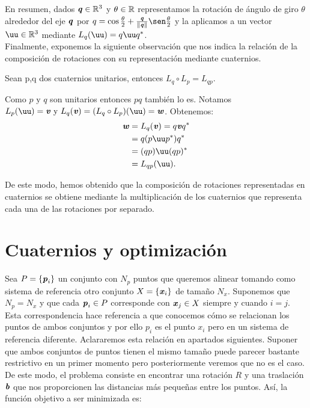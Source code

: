 En resumen, dados $ \textbf{\emph{q}} \in \mathbb{R}^3$ y $ \theta \in \mathbb{R}$ representamos la rotación de ángulo de giro $ \theta $ alrededor del eje $ \textbf{\emph{q}}$ por $  q = \cos\frac{\theta}{2} + \frac{\qq}{\norm{\qq}} \sen \frac{\theta}{2} $ y la aplicamos a un vector $ \uu \in \RR^3 $ mediante $ L_{q} (\uu) = q\uu q^* $.  \\
		
		Finalmente, exponemos la siguiente observación que nos indica la relación de la composición de rotaciones con su representación mediante cuaternios.
		\bigskip
		\begin{observacion}
			 Sean p,q dos cuaternios unitarios, entonces $ L_q \circ L_p = L_{qp} $. 
		\end{observacion}
		Como $ p \text{ y } q$ son unitarios entonces $ pq $ también lo es. Notamos $ L_p(\uu) = \vv \text{ y } L_q(\vv) = (L_q \circ L_p)(\uu) = \ww $. Obtenemos:
		\begin{equation*}
		\begin{split}
			\ww &= L_q(\vv) = q\vv q^* \\
			&= q(p\uu p^*) q^*\\ 
			&= (qp)\uu(qp)^* \\ 
			&= L_{qp}(\uu).
		\end{split}
		\end{equation*} 
		\bigskip
		
		De este modo, hemos obtenido que la composición de rotaciones representadas en cuaternios se obtiene mediante la multiplicación de los cuaternios que representa cada una de las rotaciones por separado. \\
				
	
	\section{Cuaternios y optimización}\label{optimizacion}
Sea $ P = \{\textbf{\emph{p}}_i\} $ un conjunto con $ N_p $ puntos que queremos alinear tomando como sistema de referencia otro conjunto $ X = \{\textbf{\emph{x}}_i\} $ de tamaño $ N_x $. Suponemos que $ N_p = N_x $ y que cada $ \textbf{\emph{p}}_i \in P $ corresponde con $ \textbf{\emph{x}}_j \in X $ siempre y cuando $ i = j $. Esta correspondencia hace referencia a que conocemos cómo se relacionan los puntos de ambos conjuntos y por ello $ p_i $ es el punto $ x_i $ pero en un sistema de referencia diferente. Aclararemos esta relación en apartados siguientes. Suponer que ambos conjuntos de puntos tienen el mismo tamaño puede parecer bastante restrictivo en un primer momento pero posteriormente veremos que no es el caso. De este modo, el problema consiste en encontrar una rotación $ R $ y una traslación $ \textbf{\emph{b}} $ que nos proporcionen las distancias más pequeñas entre los puntos. Así, la función objetivo a ser minimizada es:
		
